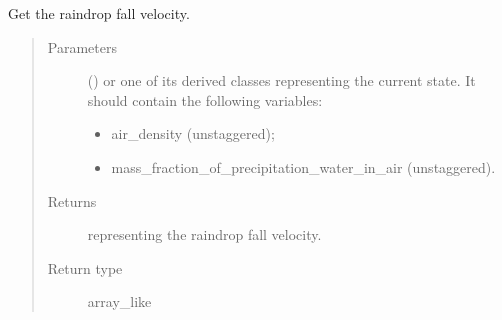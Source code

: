 \documentclass[letterpaper,10pt,english]{sphinxmanual}
\begin{document}
\begin{fulllineitems}
\begin{fulllineitems}
\label{\detokenize{api:tasmania.parameterizations.slow_tendency_microphysics_kessler_wrf.SlowTendencyMicrophysicsKesslerWRF.get_raindrop_fall_velocity}}
Get the raindrop fall velocity.
\begin{quote}\begin{description}
\item[{Parameters}] \leavevmode
{} () \textendash{} 
{\hyperref[\detokenize{api:tasmania.storages.grid_data.GridData}]{}} or one of its derived classes representing the current state.
It should contain the following variables:
\begin{itemize}
\item {} 
air\_density (unstaggered);

\item {} 
mass\_fraction\_of\_precipitation\_water\_in\_air (unstaggered).

\end{itemize}


\item[{Returns}] \leavevmode
{} representing the raindrop fall velocity.

\item[{Return type}] \leavevmode
array\_like

\end{description}\end{quote}

\end{fulllineitems}


\end{fulllineitems}

\end{document}
